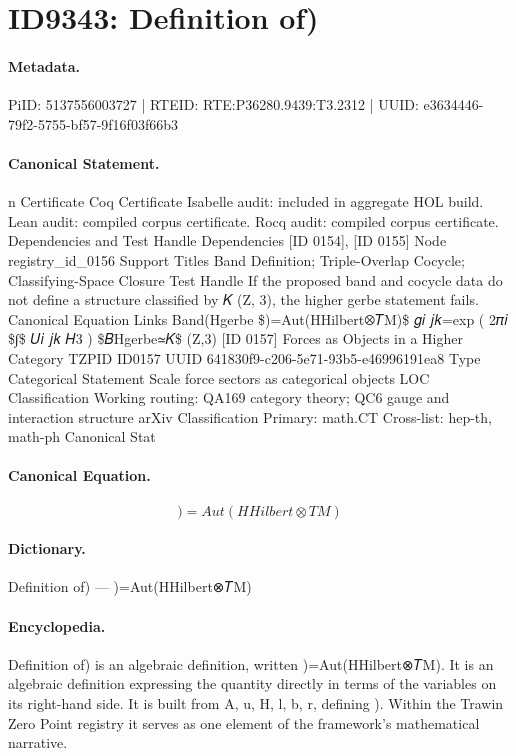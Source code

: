 \section*{ID9343: Definition of)}
\paragraph{Metadata.}
PiID: 5137556003727 | RTEID: RTE:P36280.9439:T3.2312 | UUID: e3634446-79f2-5755-bf57-9f16f03f66b3

\paragraph{Canonical Statement.}
n Certificate Coq Certificate Isabelle audit: included in aggregate HOL build. Lean audit: compiled corpus certificate. Rocq audit: compiled corpus certificate. Dependencies and Test Handle Dependencies [ID 0154], [ID 0155] Node registry\_id\_0156 Support Titles Band Definition; Triple-Overlap Cocycle; Classifying-Space Closure Test Handle If the proposed band and cocycle data do not define a structure classified by 𝐾 (Z, 3), the higher gerbe statement fails. Canonical Equation Links Band(Hgerbe \$)=Aut(HHilbert⊗𝑇M)\$ 𝑔𝑖 𝑗𝑘=exp ( 2𝜋𝑖 \$∫\$ 𝑈𝑖 𝑗𝑘 𝐻3 ) \$𝐵Hgerbe≃𝐾\$ (Z,3) [ID 0157] Forces as Objects in a Higher Category TZPID ID0157 UUID 641830f9-c206-5e71-93b5-e46996191ea8 Type Categorical Statement Scale force sectors as categorical objects LOC Classification Working routing: QA169 category theory; QC6 gauge and interaction structure arXiv Classification Primary: math.CT Cross-list: hep-th, math-ph Canonical Stat

\paragraph{Canonical Equation.}
\[
)=Aut(HHilbert⊗𝑇M)
\]

\paragraph{Dictionary.}
Definition of) — )=Aut(HHilbert⊗𝑇M)

\paragraph{Encyclopedia.}
Definition of) is an algebraic definition, written )=Aut(HHilbert⊗𝑇M). It is an algebraic definition expressing the quantity directly in terms of the variables on its right-hand side. It is built from A, u, H, l, b, r, defining ). Within the Trawin Zero Point registry it serves as one element of the framework's mathematical narrative.
